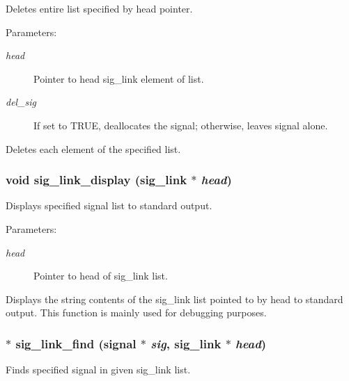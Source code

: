 Deletes entire list specified by head pointer. 

\begin{Desc}
\item[Parameters:]
\begin{description}
\item[{\em head}]Pointer to head sig\_\-link element of list. \item[{\em del\_\-sig}]If set to TRUE, deallocates the signal; otherwise, leaves signal alone.\end{description}
\end{Desc}
Deletes each element of the specified list. 
\subsubsection{\setlength{\rightskip}{0pt plus 5cm}void sig\_\-link\_\-display ({\bf sig\_\-link} $\ast$ {\em head})}\label{link_8h_a9}


Displays specified signal list to standard output. 

\begin{Desc}
\item[Parameters:]
\begin{description}
\item[{\em head}]Pointer to head of sig\_\-link list.\end{description}
\end{Desc}
Displays the string contents of the sig\_\-link list pointed to by head to standard output. This function is mainly used for debugging purposes. 
\subsubsection{$\ast$ sig\_\-link\_\-find ({\bf signal} $\ast$ {\em sig}, {\bf sig\_\-link} $\ast$ {\em head})}\label{link_8h_a14}


Finds specified signal in given sig\_\-link list. 

